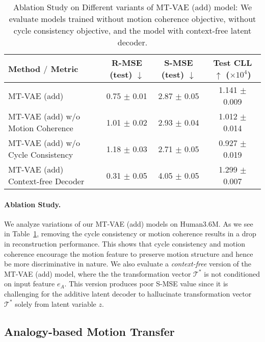 \documentclass[runningheads]{llncs}
\newcommand{\cutsubsectionup}{\vspace*{-0.1in}}
\newcommand{\cutsubsectiondown}{\vspace*{-0.07in}}
\begin{document}
\begin{table}[t]
\small
\caption{
Ablation Study on Different variants of MT-VAE (add) model: We evaluate models trained without motion coherence objective, without cycle consistency objective, and the model with context-free latent decoder.
}
\centering
\begin{tabular}{l||c|c|c}
\hline
{Method $/$ Metric} & {R-MSE (test) $\downarrow$} & {S-MSE (test) $\downarrow$} & {Test CLL $\uparrow$ ($\times 10^4$)}\\
\hline
MT-VAE (add) & 0.75 $\pm$ 0.01 & 2.87 $\pm$ 0.05 & 1.141 $\pm$ 0.009\\
\hline
MT-VAE (add) w/o Motion Coherence & 1.01 $\pm$ 0.02 & 2.93 $\pm$ 0.04 & 1.012 $\pm$ 0.014\\
\hline
MT-VAE (add) w/o Cycle Consistency & 1.18 $\pm$ 0.03 & 2.71 $\pm$ 0.05 & 0.927 $\pm$ 0.019\\
\hline 
MT-VAE (add) Context-free Decoder & 0.31 $\pm$ 0.05 & 4.05 $\pm$ 0.05 & 1.299 $\pm$ 0.007\\
\hline
\end{tabular}
\label{tab:table_h36m_ablation}
\vspace*{-0.1in}
\end{table}

\paragraph{Ablation Study.}
\vspace*{-0.1in}

We analyze variations of our MT-VAE (add) models on Human3.6M.
As we see in Table~\ref{tab:table_h36m_ablation}, removing the cycle consistency or motion coherence  results in a drop in reconstruction performance.
This shows that cycle consistency and motion coherence encourage the motion feature to preserve motion structure and hence be more discriminative in nature.
We also evaluate a \textit{context-free} version of the MT-VAE (add) model, where the the transformation vector $\mathcal{T}^*$ is not conditioned on input feature $e_A$. This version  produces poor S-MSE value since it is challenging for the additive latent decoder to hallucinate transformation vector $\mathcal{T}^*$ solely from latent variable $z$.


\cutsubsectionup
\subsection{Analogy-based Motion Transfer}
\cutsubsectiondown
\end{document}
